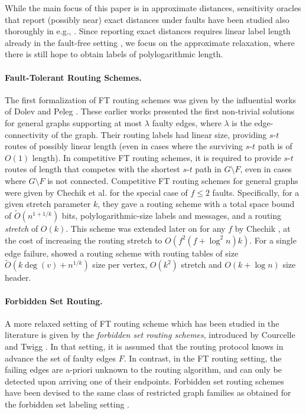 While the main focus of this paper is in approximate distances, sensitivity oracles that report (possibly near) exact distances under faults have been studied also thoroughly in e.g., \cite{demetrescu2002oracles,bernstein2008improved,duan2009dual,WeimannY10,GrandoniW12,ChechikCFK17,van2019sensitive}. Since reporting exact distances requires linear label length already in the fault-free setting \cite{gavoille2004distance}, we focus on the approximate relaxation, where there is still hope to obtain labels of polylogarithmic length.

\paragraph{Fault-Tolerant Routing Schemes.}
The first formalization of FT routing schemes was given by the influential works of Dolev \cite{dolev1984new} and Peleg \cite{peleg1987fault}. These earlier works presented the first non-trivial solutions for general graphs supporting at most $\lambda$ faulty edges, where $\lambda$ is the edge-connectivity of the graph. Their routing labels had linear size, providing $s$-$t$ routes of possibly linear length (even in cases where the surviving $s$-$t$ path is of $O(1)$ length). In competitive FT routing schemes, it is required to provide $s$-$t$ routes of length that competes with the shortest $s$-$t$ path in $G \setminus F$, even in cases where $G \setminus F$ is not connected. Competitive FT routing schemes \cite{peleg2009good} for general graphs were given by Chechik et al. \cite{ChechikLPR10,chechik2012f} for the special case of $f\leq 2$ faults. 
Specifically, for a given stretch parameter $k$, they gave a routing scheme with a total space bound of $\widetilde{O}(n^{1+1/k})$ bits, polylogarithmic-size labels and messages, and a routing \emph{stretch} of $O(k)$. 
This scheme was extended later on for any $f$ by Chechik \cite{chechik2011fault}, at the cost of increasing the routing stretch to $O(f^2(f+\log^2 n)k)$. For a single edge failure, \cite{rajan2012space} showed a routing scheme with routing tables of size $\widetilde{O}(k \deg(v)+ n^{1/k})$ size per vertex, $O(k^2)$ stretch and $O(k+\log{n})$ size header.

\paragraph{Forbidden Set Routing.}
A more relaxed setting of FT routing scheme which has been studied in the literature is given by the \emph{forbidden set routing schemes}, introduced by Courcelle and Twigg \cite{CourcelleT07}. In that setting, it is assumed that the routing protocol knows in advance the set of faulty edges $F$. In contrast, in the FT routing setting, the failing edges are a-priori unknown to the routing algorithm,  and can only be detected upon arriving one of their endpoints. Forbidden set routing schemes have been devised to the same class of restricted graph families as obtained for the forbidden set labeling setting \cite{CourcelleT07,AbrahamCGP16,abraham2012fully}.